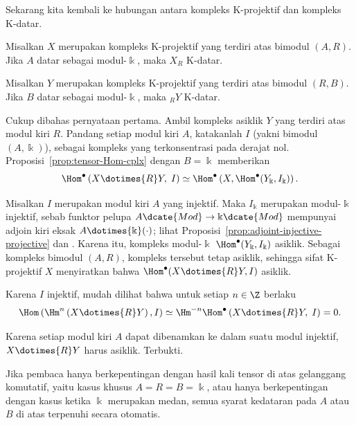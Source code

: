 Sekarang kita kembali ke hubungan antara kompleks K-projektif dan kompleks
K-datar.

\begin{lema}\label{prop:K-projective-flat}
	Misalkan $X$ merupakan kompleks K-projektif yang terdiri atas bimodul
	$(A,R)$. Jika $A$ datar sebagai modul-$\Bbbk$, maka $X_R$ K-datar.

	Misalkan $Y$ merupakan kompleks K-projektif yang terdiri atas bimodul
	$(R,B)$. Jika $B$ datar sebagai modul-$\Bbbk$, maka ${}_RY$ K-datar.
\end{lema}

\begin{bukti}
	Cukup dibahas pernyataan pertama. Ambil kompleks asiklik $Y$ yang terdiri
	atas modul kiri $R$. Pandang setiap modul kiri $A$, katakanlah $I$ (yakni
	bimodul $(A,\Bbbk)$), sebagai kompleks yang terkonsentrasi pada derajat nol.
	Proposisi~\ref{prop:tensor-Hom-cplx} dengan $B=\Bbbk$ memberikan
	\[ \Hom^\bullet\left(X \dotimes{R} Y, \; I\right) \simeq \Hom^\bullet\left(X, \Hom^\bullet(Y_{\Bbbk}, I_{\Bbbk}) \right). \]

	Misalkan $I$ merupakan modul kiri $A$ yang injektif. Maka $I_{\Bbbk}$
	merupakan modul-$\Bbbk$ injektif, sebab funktor pelupa
	$A\dcate{Mod}\to\Bbbk\dcate{Mod}$ mempunyai adjoin kiri eksak
	$A\dotimes{\Bbbk}(\cdot)$; lihat
	Proposisi~\ref{prop:adjoint-injective-projective} dan
	\cite[Korolari 6.6.8]{Li1}. Karena itu, kompleks modul-$\Bbbk$
	$\Hom^\bullet(Y_{\Bbbk},I_{\Bbbk})$ asiklik. Sebagai kompleks bimodul
	$(A,R)$, kompleks tersebut tetap asiklik, sehingga sifat K-projektif $X$
	menyiratkan bahwa $\Hom^\bullet(X\dotimes{R}Y,I)$ asiklik.

	Karena $I$ injektif, mudah dilihat bahwa untuk setiap $n\in\Z$ berlaku
	\[ \Hom\left( \Hm^n\left( X \dotimes{R} Y \right), I\right) \simeq \Hm^{-n} \Hom^\bullet\left( X \dotimes{R} Y, \; I \right) = 0. \]

	Karena setiap modul kiri $A$ dapat dibenamkan ke dalam suatu modul injektif,
	$X\dotimes{R}Y$ harus asiklik. Terbukti.
\end{bukti}

Jika pembaca hanya berkepentingan dengan hasil kali tensor di atas gelanggang
komutatif, yaitu kasus khusus $A=R=B=\Bbbk$, atau hanya berkepentingan dengan
kasus ketika $\Bbbk$ merupakan medan, semua syarat kedataran pada $A$ atau $B$
di atas terpenuhi secara otomatis.


